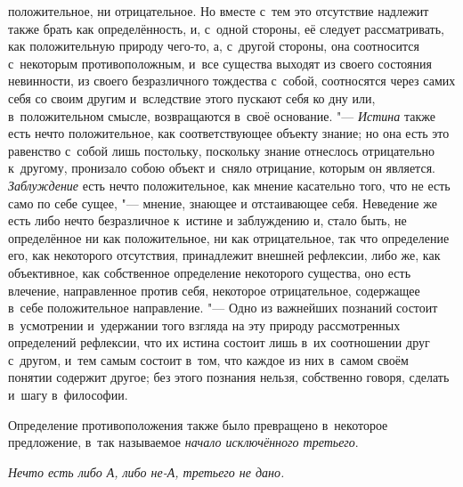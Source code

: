 положительное, ни отрицательное. Но вместе с~тем это отсутствие надлежит
также брать как определённость, и, с~одной стороны, её следует
рассматривать, как положительную природу чего-то, а, с~другой стороны, она
соотносится с~некоторым противоположным, и~все существа выходят из своего
состояния невинности, из своего безразличного тождества с~собой,
соотносятся через самих себя со своим другим и~вследствие этого пускают
себя ко дну или, в~положительном смысле, возвращаются в~своё
основание. "--- {\em Истина} также есть нечто положительное, как
соответствующее объекту знание; но она есть это равенство с~собой лишь
постольку, поскольку знание отнеслось отрицательно к~другому, пронизало
собою объект и~сняло отрицание, которым он является.
{\em Заблуждение} есть нечто положительное, как мнение
касательно того, что не есть само по себе сущее, "--- мнение, знающее и
отстаивающее себя. Неведение же есть либо нечто безразличное к~истине и
заблуждению и, стало быть, не определённое ни как положительное, ни как
отрицательное, так что определение его, как некоторого отсутствия,
принадлежит внешней рефлексии, либо же, как объективное, как собственное
определение некоторого существа, оно есть влечение, направленное против
себя, некоторое отрицательное, содержащее в~себе положительное направление.
"--- Одно из важнейших познаний состоит в~усмотрении и~удержании того взгляда
на эту природу рассмотренных определений рефлексии, что их истина состоит
лишь в~их соотношении друг с~другом, и~тем самым состоит в~том, что каждое
из них в~самом своём понятии содержит другое; без этого познания нельзя,
собственно говоря, сделать и~шагу в~философии.


Определение противоположения также было превращено в~некоторое предложение,
в~так называемое {\em начало исключённого третьего}.

{\em Нечто есть либо А, либо не-А, третьего не дано.}

